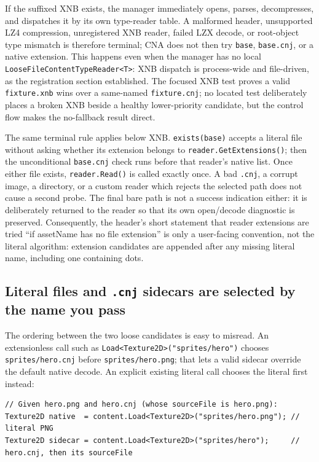 If the suffixed XNB exists, the manager immediately opens, parses, decompresses, and dispatches
it by its own type-reader table. A malformed header, unsupported LZ4 compression, unregistered
XNB reader, failed LZX decode, or root-object type mismatch is therefore terminal; CNA does not
then try \texttt{base}, \texttt{base.cnj}, or a native extension. This happens even when the
manager has no local \texttt{LooseFileContentTypeReader<T>}: XNB dispatch is process-wide and
file-driven, as the registration section established. The focused XNB test proves a valid
\texttt{fixture.xnb} wins over a same-named \texttt{fixture.cnj}; no located test deliberately
places a broken XNB beside a healthy lower-priority candidate, but the control flow makes the
no-fallback result direct.

The same terminal rule applies below XNB. \texttt{exists(base)} accepts a literal file without
asking whether its extension belongs to \texttt{reader.GetExtensions()}; then the unconditional
\texttt{base.cnj} check runs before that reader's native list. Once either file exists,
\texttt{reader.Read()} is called exactly once. A bad \texttt{.cnj}, a corrupt image, a directory,
or a custom reader which rejects the selected path does not cause a second probe. The final bare
path is not a success indication either: it is deliberately returned to the reader so that its
own open/decode diagnostic is preserved. Consequently, the header's short statement that reader
extensions are tried ``if assetName has no file extension'' is only a user-facing convention, not
the literal algorithm: extension candidates are appended after any missing literal name,
including one containing dots.

\subsection{Literal files and \texttt{.cnj} sidecars are selected by the name you pass}

The ordering between the two loose candidates is easy to misread. An extensionless call such as
\texttt{Load<Texture2D>("sprites/hero")} chooses \texttt{sprites/hero.cnj} before
\texttt{sprites/hero.png}; that lets a valid sidecar override the default native decode. An
explicit existing literal call chooses the literal first instead:

\begin{lstlisting}
// Given hero.png and hero.cnj (whose sourceFile is hero.png):
Texture2D native  = content.Load<Texture2D>("sprites/hero.png"); // literal PNG
Texture2D sidecar = content.Load<Texture2D>("sprites/hero");     // hero.cnj, then its sourceFile
\end{lstlisting}


